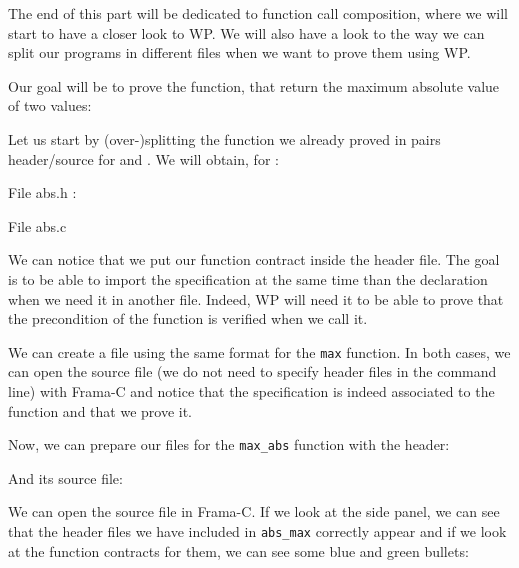 The end of this part will be dedicated to function call composition,
where we will start to have a closer look to WP. We will also have a
look to the way we can split our programs in different files when we
want to prove them using WP.

Our goal will be to prove the  function, that return
the maximum absolute value of two values:






Let us start by (over-)splitting the function we already proved in pairs
header/source for  and . We will obtain, for
:



File abs.h :




File abs.c




We can notice that we put our function contract inside the header file.
The goal is to be able to import the specification at the same time than
the declaration when we need it in another file. Indeed, WP will need it
to be able to prove that the precondition of the function is verified
when we call it.

We can create a file using the same format for the \texttt{max}
function. In both cases, we can open the source file (we do not need to
specify header files in the command line) with Frama-C and notice that
the specification is indeed associated to the function and that we prove
it.


Now, we can prepare our files for the \texttt{max\_abs} function with
the header:






And its source file:






We can open the source file in Frama-C. If we look at the side panel, we
can see that the header files we have included in \texttt{abs\_max}
correctly appear and if we look at the function contracts for them, we
can see some blue and green bullets:



